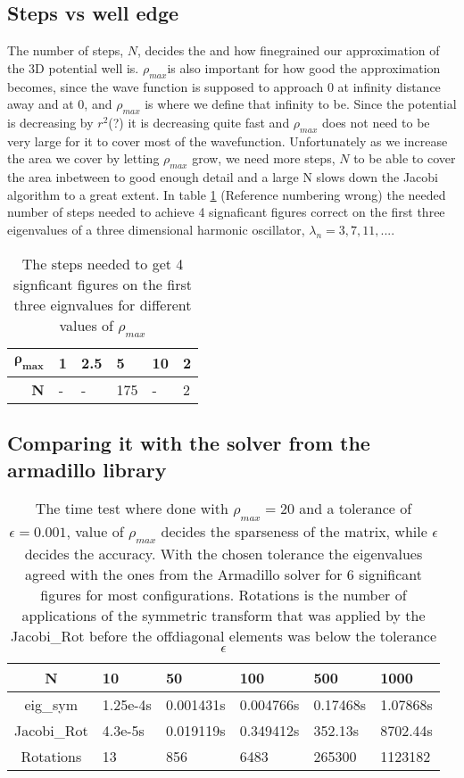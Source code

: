 \documentclass[11pt,a4wide]{article}
\begin{document}
	\subsection{Steps vs well edge} 
	The number of steps, \(N\), decides the and how finegrained our approximation of the 3D potential well is.
	 \(\rho_{max} \)is also important for how good the approximation becomes, since the wave function is supposed to approach
	 0 at infinity distance away and at \(0\), and \(\rho_{max}\) is where we define that infinity to be. Since the potential is decreasing by \(r^2\)(?)
	 it is decreasing quite fast and \(\rho_{max} \) does not need to be very large for it to cover most of the wavefunction.
	 Unfortunately as we increase the area we cover by letting \(\rho_{max} \) grow, we need more steps, \(N\) to be able to cover
	 the area inbetween to good enough detail and a large N slows down the Jacobi algorithm to a great extent. 
	 In table \ref{table:Steps} (Reference numbering wrong) the needed number of steps needed to achieve 4 signaficant figures correct
	  on the first three eigenvalues of a three dimensional harmonic oscillator, \(\lambda_n = 3, 7 , 11 , ...\).
	
	\begin{table}
		\begin{tabular}{|r|l|l|l|l|l|}
		\hline 
		\(\mathbf{\rho_{max}}\) 	& 1 	& 2.5	& 5	  &		10	&	2
		\\
		\hline
		\textbf{N} 					& - 	& 	-	& 175 &		- 	&	2	
		\\ \hline
		\end{tabular}
	\label{table:Steps}
	\caption{The steps needed to get 4 signficant figures on the first three eignvalues for different values of \(\rho_{max}\)}
	\end{table}
	
	\subsection{Comparing it with the solver from the armadillo library}
	\begin{table}
		\begin{tabular}{|c|l|l|l|l|l|}
		\hline
		N			& 	10			&	50			&	100			&	500			&	1000
		\\ \hline
		eig\_sym	&	1.25e-4s	&	0.001431s	&	0.004766s	&	0.17468s	&	1.07868s
		\\	\hline		
		Jacobi\_Rot	&	4.3e-5s		&	0.019119s	&	0.349412s	&	352.13s		&	8702.44s
		\\ \hline
		Rotations	& 13			&	856			& 	6483		& 	265300		&	1123182
		\\ \hline
		\end{tabular}
	\caption{The time test where done with \(\rho_{max}= 20\) and a tolerance of \( \epsilon = 0.001\), value of \(\rho_{max}\) 
			decides the sparseness of the matrix, while \(\epsilon\) decides the accuracy. With the chosen tolerance the eigenvalues 
			agreed with the ones from the Armadillo solver for \(6\) significant figures for most configurations.
			Rotations is the number of applications of the symmetric transform that was applied by the Jacobi\_Rot before the offdiagonal elements was below 
			the tolerance \(\epsilon\)}
	\end{table}
	
\end{document}
